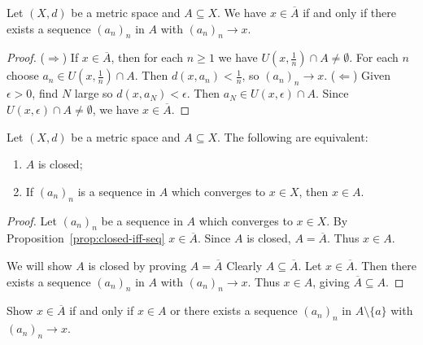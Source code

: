     \begin{proposition}\label{prop:1}
        Let $(X,d)$ be a metric space and $A \subseteq X$. We have $x \in \overline{A}$ if and only if there exists a sequence $(a_n)_n$ in $A$ with $(a_n)_n \rightarrow x$.
    \end{proposition}
        \begin{proof}
            ($\Rightarrow$) If $x \in \overline{A}$, then for each $n \geq 1$ we have $U(x,\frac{1}{n}) \cap A \neq \emptyset$. For each $n$ choose $a_n \in U(x,\frac{1}{n}) \cap A$. Then $d(x,a_n)<\frac{1}{n}$, so $(a_n)_n \rightarrow x$. ($\Leftarrow$) Given $\epsilon > 0$, find $N$ large so $d(x,a_N) < \epsilon$. Then $a_N \in U(x,\epsilon) \cap A$. Since $U(x,\epsilon) \cap A \neq \emptyset$, we have $x \in \overline{A}$.
        \end{proof}

    \begin{proposition}\label{prop:closed-iff-seq}
        Let $(X,d)$ be a metric space and $A \subseteq X$. The following are equivalent:
            \begin{enumerate}[label = (\arabic*),itemsep=1pt,topsep=3pt]
                \item $A$ is closed;
                \item If $(a_n)_n$ is a sequence in $A$ which converges to $x \in X$, then $x \in A$.
            \end{enumerate}
    \end{proposition}
        \begin{proof}
            Let $(a_n)_n$ be a sequence in $A$ which converges to $x \in X$. By Proposition~\ref{prop:closed-iff-seq} $x \in \overline{A}$. Since $A$ is closed, $A = \overline{A}$. Thus $x \in A$.

            We will show $A$ is closed by proving $A = \overline{A}$ Clearly $A \subseteq \overline{A}$. Let $x \in \overline{A}$. Then there exists a sequence $(a_n)_n$ in $A$ with $(a_n)_n \rightarrow x$. Thus $x \in A$, giving $\overline{A} \subseteq A$.
        \end{proof}

    \begin{exercise}
        Show $x \in \overline{A}$ if and only if $x \in A$ or there exists a sequence $(a_n)_n$ in $A \setminus\{a\}$ with $(a_n)_n \rightarrow x$.
    \end{exercise}
    
    \newpage

